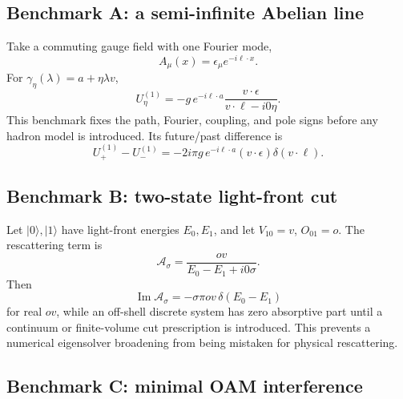 \documentclass[11pt]{article}
\newcommand{\cA}{\mathcal A}
\begin{document}
\subsection{Benchmark A: a semi-infinite Abelian line}

Take a commuting gauge field with one Fourier mode,
\begin{equation}
 A_\mu(x)=\epsilon_\mu e^{-i\ell\cdot x}.
\label{eq:abelian-mode}
\end{equation}
For \(\gamma_\eta(\lambda)=a+\eta\lambda v\),
\begin{equation}
 U_{\eta}^{(1)}
 =-g\,e^{-i\ell\cdot a}
 \frac{v\cdot\epsilon}{v\cdot\ell-i0\eta}.
\label{eq:abelian-line-benchmark}
\end{equation}
This benchmark fixes the path, Fourier, coupling, and pole signs before any
hadron model is introduced.  Its future/past difference is
\begin{equation}
 U_+^{(1)}-U_-^{(1)}
 =-2i\pi g\,e^{-i\ell\cdot a}
 (v\cdot\epsilon)\delta(v\cdot\ell).
\label{eq:abelian-line-difference}
\end{equation}

\subsection{Benchmark B: two-state light-front cut}

Let \(|0\rangle,|1\rangle\) have light-front energies \(E_0,E_1\), and let
\(V_{10}=v\), \(O_{01}=o\).  The rescattering term is
\begin{equation}
 \cA_\sigma
 =\frac{o v}{E_0-E_1+i0\sigma}.
\label{eq:two-state-amplitude}
\end{equation}
Then
\begin{equation}
 \operatorname{Im}\cA_\sigma
 =-\sigma\pi o v\,\delta(E_0-E_1)
\label{eq:two-state-cut}
\end{equation}
for real \(ov\), while an off-shell discrete system has zero absorptive part
until a continuum or finite-volume cut prescription is introduced.  This
prevents a numerical eigensolver broadening from being mistaken for physical
rescattering.

\subsection{Benchmark C: minimal OAM interference}
\end{document}
